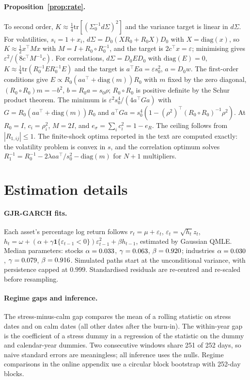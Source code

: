 \documentclass[12pt]{article}
\theoremstyle{definition}
\theoremstyle{remark}
\begin{document}
\begin{doublespace}
\paragraph{Proposition~\ref{prop:rate}.} To second order,
$K\approx\tfrac14\mathrm{tr}[(\Sigma_0^{-1}d\Sigma)^2]$ and the variance target
is linear in $d\Sigma$. For volatilities, $s_i=1+x_i$, $d\Sigma=D_0(XR_0+R_0X)D_0$
with $X=\mathrm{diag}(x)$, so $K\approx\tfrac12x^\top Mx$ with
$M=I+R_0\circ R_0^{-1}$, and the target is $2c^\top x=\varepsilon$; minimising
gives $\varepsilon^2/(8c^\top M^{-1}c)$. For correlations, $d\Sigma=D_0ED_0$ with
$\mathrm{diag}(E)=0$, $K\approx\tfrac14\mathrm{tr}(R_0^{-1}ER_0^{-1}E)$ and the
target is $a^\top Ea=\varepsilon s_0^2$, $a=D_0w$. The first-order conditions
give $E\propto R_0(aa^\top+\mathrm{diag}(m))R_0$ with $m$ fixed by the zero
diagonal, $(R_0\circ R_0)m=-b^2$, $b=R_0a=s_0\rho$; $R_0\circ R_0$ is
positive definite by the Schur product theorem. The minimum is
$\varepsilon^2s_0^4/(4a^\top G a)$ with $G=R_0(aa^\top+\mathrm{diag}(m))R_0$
and $a^\top Ga=s_0^4(1-(\rho^2)^\top(R_0\circ R_0)^{-1}\rho^2)$. At $R_0=I$,
$c_i=\rho_i^2$, $M=2I$, and $e_\sigma=\sum_ic_i^2=1-e_R$. The ceiling follows
from $|R_{1,ij}|\le1$. The finite-shock optima reported in the text are
computed exactly: the volatility problem is convex in $s$, and the
correlation optimum solves $R_1^{-1}=R_0^{-1}-2\lambda aa^\top/s_0^2-
\mathrm{diag}(m)$ for $N+1$ multipliers.

\section{Estimation details}
\label{app:details}

\paragraph{GJR-GARCH fits.} Each asset's percentage log return follows
$r_t=\mu+\varepsilon_t$, $\varepsilon_t=\sqrt{h_t}z_t$,
$h_t=\omega+(\alpha+\gamma\mathbf 1\{\varepsilon_{t-1}<0\})
\varepsilon_{t-1}^2+\beta h_{t-1}$, estimated by Gaussian QMLE. Median
parameters: stocks $\alpha=0.033$, $\gamma=0.063$,
$\beta=0.920$; industries $\alpha=0.030$, $\gamma=0.079$,
$\beta=0.916$. Simulated paths start at the unconditional variance, with
persistence capped at $0.999$. Standardised residuals are re-centred and
re-scaled before resampling.

\paragraph{Regime gaps and inference.} The stress-minus-calm gap compares the
mean of a rolling statistic on stress dates and on calm dates (all other dates
after the burn-in). The within-year gap is the coefficient of a stress dummy
in a regression of the statistic on the dummy and calendar-year dummies.
Two consecutive windows share 251 of 252 days, so naive standard errors are
meaningless; all inference uses the nulls. Regime comparisons in the online
appendix use a circular block bootstrap with 252-day blocks.


\end{doublespace}
\end{document}
